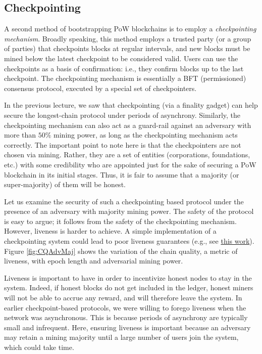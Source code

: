 \documentclass{article}
\begin{document}
\subsection*{Checkpointing}
A second method of bootstrapping PoW blockchains is to employ a \textit{checkpointing mechanism}. Broadly speaking, this method employs a trusted party (or a group of parties) that checkpoints blocks at regular intervals, and new blocks must be mined below the latest checkpoint to be considered valid. Users can use the checkpoints as a basis of confirmation: i.e., they confirm blocks up to the last checkpoint. The checkpointing mechanism is essentially a BFT (permissioned) consensus protocol, executed by a special set of checkpointers.

In the previous lecture, we saw that checkpointing (via a finality gadget) can help secure the longest-chain protocol under periods of asynchrony. Similarly, the checkpointing mechanism can also act as a guard-rail against an adversary with more than $50\%$ mining power, as long as the checkpointing mechanism acts correctly. The important point to note here is that the checkpointers are not chosen via mining. Rather, they are a set of entities (corporations, foundations, etc.) with some credibility who are appointed just for the sake of securing a PoW blockchain in its initial stages. Thus, it is fair to assume that a majority (or super-majority) of them will be honest.

Let us examine the security of such a checkpointing based protocol under the presence of an adversary with majority mining power. The safety of the protocol is easy to argue; it follows from the safety of the checkpointing mechanism. However, liveness is harder to achieve. A simple implementation of a checkpointing system could lead to poor liveness guarantees (e.g., see \href{https://eprint.iacr.org/2020/173.pdf}{this work}). Figure \ref{fig:CQAdvMaj} shows the variation of the chain quality, a metric of liveness, with epoch length and adversarial mining power.

Liveness is important to have in order to incentivize honest nodes to stay in the system. Indeed, if honest blocks do not get included in the ledger, honest miners will not be able to accrue any reward, and will therefore leave the system. In earlier checkpoint-based protocols, we were willing to forego liveness when the network was asynchronous. This is because periods of asynchrony are typically small and infrequent. Here, ensuring liveness is important because an adversary may retain a mining majority until a large number of users join the system, which could take time.
\end{document}
